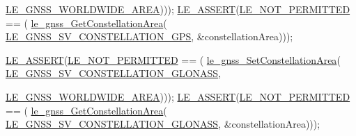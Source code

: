 \begin{DoxyCodeInclude}
      \hyperlink{le__gnss__interface_8h_a5e928e23604366956aea1b049e290d3dacb2cc82376d1eee7b25dc169e856fef0}{LE\_GNSS\_WORLDWIDE\_AREA})));
    \hyperlink{le__log_8h_ac0dbbef91dc0fed449d0092ff0557b39}{LE\_ASSERT}(\hyperlink{le__basics_8h_a1cca095ed6ebab24b57a636382a6c86cac6c0cac62213b786dabd7bf3e73bcec1}{LE\_NOT\_PERMITTED} == (
      \hyperlink{le__gnss__interface_8h_a2904b06453428ad1d71609f06b440e08}{le\_gnss\_GetConstellationArea}(
      \hyperlink{le__gnss__interface_8h_a30697e968cedd1935e7ca5f3ebe2fea9ac6f47b9be468f8cda7beda6afe0e1324}{LE\_GNSS\_SV\_CONSTELLATION\_GPS},
                                                                &constellationArea)));

    \hyperlink{le__log_8h_ac0dbbef91dc0fed449d0092ff0557b39}{LE\_ASSERT}(\hyperlink{le__basics_8h_a1cca095ed6ebab24b57a636382a6c86cac6c0cac62213b786dabd7bf3e73bcec1}{LE\_NOT\_PERMITTED} == (
      \hyperlink{le__gnss__interface_8h_a954fcc8ecae822195e30a2af5e93fd0e}{le\_gnss\_SetConstellationArea}(
      \hyperlink{le__gnss__interface_8h_a30697e968cedd1935e7ca5f3ebe2fea9ab349eed6d7964f39ae97645bd84c219c}{LE\_GNSS\_SV\_CONSTELLATION\_GLONASS},
                                                                
      \hyperlink{le__gnss__interface_8h_a5e928e23604366956aea1b049e290d3dacb2cc82376d1eee7b25dc169e856fef0}{LE\_GNSS\_WORLDWIDE\_AREA})));
    \hyperlink{le__log_8h_ac0dbbef91dc0fed449d0092ff0557b39}{LE\_ASSERT}(\hyperlink{le__basics_8h_a1cca095ed6ebab24b57a636382a6c86cac6c0cac62213b786dabd7bf3e73bcec1}{LE\_NOT\_PERMITTED} == (
      \hyperlink{le__gnss__interface_8h_a2904b06453428ad1d71609f06b440e08}{le\_gnss\_GetConstellationArea}(
      \hyperlink{le__gnss__interface_8h_a30697e968cedd1935e7ca5f3ebe2fea9ab349eed6d7964f39ae97645bd84c219c}{LE\_GNSS\_SV\_CONSTELLATION\_GLONASS},
                                                                &constellationArea)));


\end{DoxyCodeInclude}
